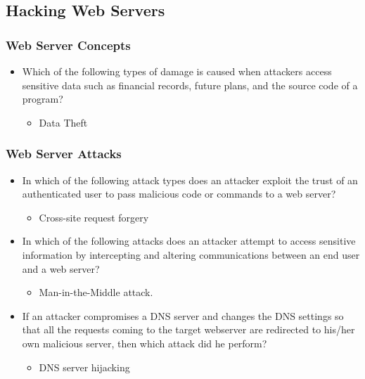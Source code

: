 \subsection{Hacking Web Servers}
\subsubsection{Web Server Concepts}
\begin{itemize}
    \item Which of the following types of damage is caused when attackers access sensitive data such as financial records, future plans, and the source code of a program?
    \begin{itemize}
        \item Data Theft
    \end{itemize}
\end{itemize}
\subsubsection{Web Server Attacks}
\begin{itemize}
    \item In which of the following attack types does an attacker exploit the trust of an authenticated user to pass malicious code or commands to a web server?
    \begin{itemize}
        \item Cross-site request forgery
    \end{itemize}
    \item In which of the following attacks does an attacker attempt to access sensitive information by intercepting and altering communications between an end user and a web server?
    \begin{itemize}
        \item Man-in-the-Middle attack.
    \end{itemize}
    \item If an attacker compromises a DNS server and changes the DNS settings so that all the requests coming to the target webserver are redirected to his/her own malicious server, then which attack did he perform?
    \begin{itemize}
        \item DNS server hijacking
    \end{itemize}
\end{itemize}
